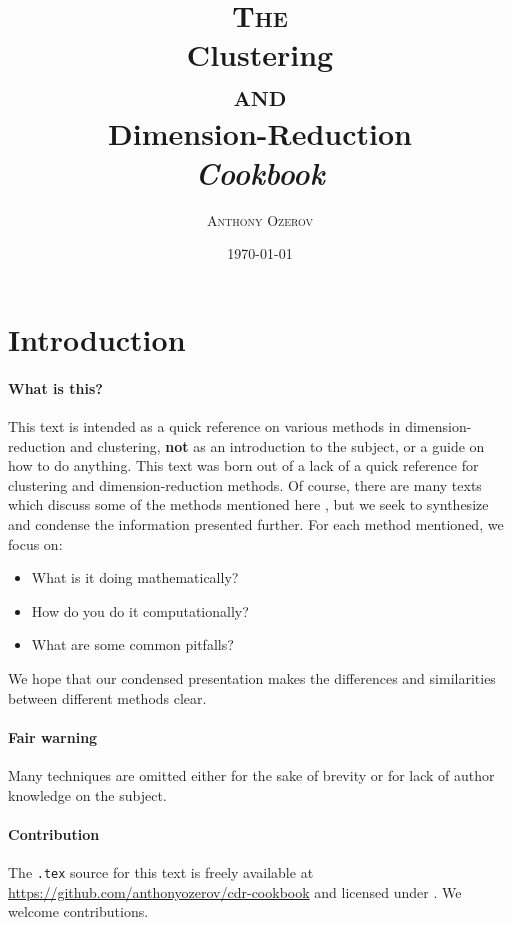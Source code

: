 \documentclass[12pt,a4paper]{article}
\title{\vspace{4em}\Large \textsc{The}\\\Huge \textbf{Clustering}\\ \Large \textsc{and}\vspace{-0.2em}\\ \Huge \textbf{Dimension-Reduction}\\ \LARGE \textit{Cookbook}}
\author{\textsc{Anthony Ozerov}}
\date{\today}
\newcommand{\1}[1]{\mathds{1}\left[#1\right]}
\begin{document}
\maketitle
\thispagestyle{empty}

\newpage
\pagestyle{fancy}
\setlength{\headheight}{15pt}
\fancyhead[L]{}
\fancyfoot[L]{\textsc{\date{\today}}}
\fancyfoot[C]{}
\fancyfoot[R]{\thepage}


\section*{Introduction}
\paragraph{What is this?}
This text is intended as a quick reference on various methods in dimension-reduction and clustering, \textbf{not} as an introduction to the subject, or a guide on how to do anything. This text was born out of a lack of a quick reference for clustering and dimension-reduction methods. Of course, there are many texts which discuss some of the methods mentioned here \cite{esl,clusteranalysis,tda,fml}, but we seek to synthesize and condense the information presented further. For each method mentioned, we focus on:
\begin{itemize}
    \item What is it doing mathematically?
    \item How do you do it computationally?
    \item What are some common pitfalls?
\end{itemize}

\noindent We hope that our condensed presentation makes the differences and similarities between different methods clear.
\paragraph{Fair warning} Many techniques are omitted either for the sake of brevity or for lack of author knowledge on the subject.

\paragraph{Contribution} The \texttt{.tex} source for this text is freely available at \url{https://github.com/anthonyozerov/cdr-cookbook} and licensed under \href{https://creativecommons.org/publicdomain/zero/1.0/}{\faCreativeCommons\faCreativeCommonsZero}. We welcome contributions.
\end{document}
